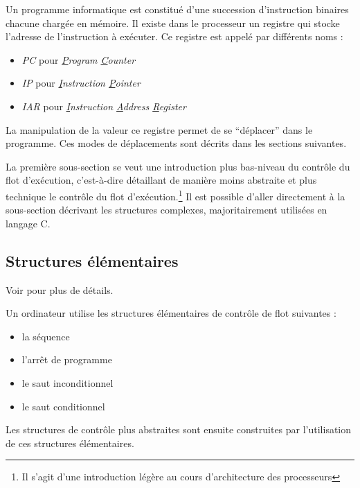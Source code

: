 \documentclass[../../../main.tex]{subfiles}
\begin{document}

Un programme informatique est constitué d'une succession d'instruction binaires chacune chargée en mémoire. Il existe dans le processeur un registre qui stocke l'adresse de l'instruction à exécuter.\newline
Ce registre est appelé par différents noms :
\begin{itemize}
	\item \textit{PC} pour \textit{\underline{P}rogram \underline{C}ounter}
	\item \textit{IP} pour \textit{\underline{I}nstruction \underline{P}ointer}
	\item \textit{IAR} pour \textit{\underline{I}nstruction \underline{A}ddress \underline{R}egister}
\end{itemize}
La manipulation de la valeur ce registre permet de se ``déplacer'' dans le programme. Ces modes de déplacements sont décrits dans les sections suivantes.
 
\begin{minipage}{\textwidth}
	\begin{center}
		
	\end{center}
\end{minipage}
 
La première sous-section se veut une introduction plus bas-niveau du contrôle du flot d'exécution, c'est-à-dire détaillant de manière moins abstraite et plus technique le contrôle du flot d'exécution.\footnote{Il s'agit d'une introduction légère au cours d'architecture des processeurs} Il est possible d'aller directement à la sous-section décrivant les structures complexes, majoritairement utilisées en langage C.
\subsection{Structures élémentaires}
Voir \cite{CSaPP} pour plus de détails.

Un ordinateur utilise les structures élémentaires de contrôle de flot suivantes :
\begin{itemize}
	\item la séquence
	\item l'arrêt de programme
	\item le saut inconditionnel
	\item le saut conditionnel
\end{itemize}
Les structures de contrôle plus abstraites sont ensuite construites par l'utilisation de ces structures élémentaires.
\end{document}
